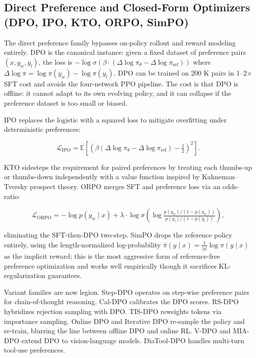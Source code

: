 \documentclass{article}
\begin{document}
\subsection{Direct Preference and Closed-Form Optimizers (DPO, IPO, KTO, ORPO, SimPO)}\label{direct-preference-and-closed-form-optimizers-dpo-ipo-kto-orpo-simpo}

The direct preference family bypasses on-policy rollout and reward modeling entirely. DPO \citep{rafailov2023directpreferenceop} is the canonical instance: given a fixed dataset of preference pairs \((x, y_w, y_l)\), the loss is \(-\log \sigma(\beta \cdot (\Delta\log \pi_\theta - \Delta\log \pi_{\text{ref}}))\) where \(\Delta\log \pi = \log\pi(y_w) - \log\pi(y_l)\). DPO can be trained on 200 K pairs in 1--2× SFT cost and avoids the four-network PPO pipeline. The cost is that DPO is offline: it cannot adapt to its own evolving policy, and it can collapse if the preference dataset is too small or biased.

IPO \citep{azar2023ageneraltheoretica} replaces the logistic with a squared loss to mitigate overfitting under deterministic preferences:

\[\mathcal{L}_{\mathrm{IPO}} = \mathbb{E}\!\left[ \left(\beta(\Delta\log\pi_\theta - \Delta\log\pi_{\text{ref}}) - \tfrac{1}{2}\right)^2 \right].\]

KTO \citep{ethayarajh2024ktomodelalignmenta} sidesteps the requirement for paired preferences by treating each thumbs-up or thumbs-down independently with a value function inspired by Kahneman--Tversky prospect theory. ORPO \citep{hong2024orpomonolithicpref} merges SFT and preference loss via an odds-ratio:

\[\mathcal{L}_{\mathrm{ORPO}} = -\log p(y_w \mid x) + \lambda \cdot \log \sigma(\log \tfrac{p(y_w)/(1-p(y_w))}{p(y_l)/(1-p(y_l))}),\]

eliminating the SFT-then-DPO two-step. SimPO \citep{meng2024simposimpleprefere} drops the reference policy entirely, using the length-normalized log-probability \(\bar\pi(y\mid x) = \tfrac{1}{|y|}\log\pi(y\mid x)\) as the implicit reward; this is the most aggressive form of reference-free preference optimization and works well empirically though it sacrifices KL-regularization guarantees.

Variant families are now legion. Step-DPO \citep{lai20242024} operates on step-wise preference pairs for chain-of-thought reasoning. Cal-DPO \citep{xiao20242024} calibrates the DPO scores. RS-DPO \citep{khaki20242024} hybridizes rejection sampling with DPO. TIS-DPO \citep{liu20232023} reweights tokens via importance sampling. Online DPO \citep{qi20232023} and Iterative DPO \citep{xiong2023iterativepreferenc} re-sample the policy and re-train, blurring the line between offline DPO and online RL. V-DPO \citep{xie2024vdpomitigatinghall} and MIA-DPO \citep{liu20252025} extend DPO to vision-language models. DiaTool-DPO \citep{jung20252025} handles multi-turn tool-use preferences.
\end{document}
